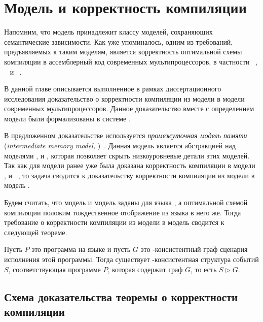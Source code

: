 \chapter{Модель \Wkm и корректность компиляции}
\label{ch:weakestmo-imm}

Напомним, что модель \Wkm принадлежит классу моделей,
сохраняющих семантические зависимости.
Как уже упоминалось, одним из требований, предъявляемых к таким моделям,
является корректность оптимальной схемы компиляции
в ассемблерный код современных мультипроцессоров,
в частности \Intel~\cite{Sewell-al:CACM10},
\ARM~\cite{Pulte-al:POPL18} и \POWER~\cite{Alglave-al:TOPLAS14}.

В данной главе описывается выполненное в рамках
диссертационного исследования доказательство
о корректности компиляции из модели \Wkm в модели
современных мультипроцессоров.
Данное доказательство вместе с определением модели \Wkm
были формализованы в системе \coq.

В предложенном доказательстве используется \emph{промежуточная модель памяти}
(\emph{intermediate memory model, \IMM})~\cite{Podkopaev-al:POPL19}.
Данная модель является абстракцией над моделями \Intel, \ARM и \POWER,
которая позволяет скрыть низкоуровневые детали этих моделей.
Так как для модели \IMM ранее уже была доказана
корректность компиляции в модели \Intel, \ARM и \POWER~\cite{Podkopaev-al:POPL19}, 
то задача сводится к доказательству корректности компиляции из модели \Wkm в модель \IMM. 

Будем считать, что модель \Wkm и модель \IMM заданы для языка \LLANG,
а оптимальной схемой компиляции положим
тождественное отображение из языка \LLANG в него же.
Тогда требование о корректности компиляции
из модели \Wkm в модель \IMM сводится к следующей теореме. 

\begin{theorem}
  \label{thm:main}
  Пусть $P$ это программа на языке \LLANG
  и пусть $G$ это \IMM-консистентный граф сценария исполнения этой программы.
  Тогда существует \Wkm-консистентная структура событий $S$,
  соответствующая программе $P$,
  которая содержит граф $G$, то есть $S \rhd G$.
\end{theorem}

\section{Схема доказательства теоремы о корректности компиляции}


